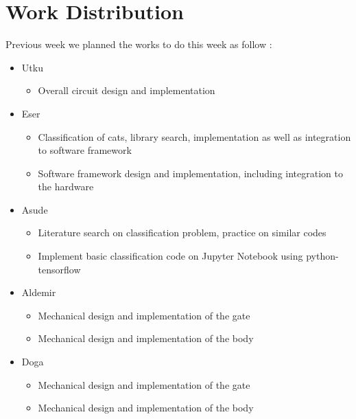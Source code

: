 \section{Work Distribution}
\label{sec:workDistribution}
Previous week we planned the works to do this week as follow :

\begin{itemize}
    \item Utku
    \begin{itemize}
        \item Overall circuit design and implementation
    \end{itemize}
    
    
    \item Eser
    \begin{itemize}
        \item Classification of cats, library search, implementation as well as integration to software framework
        \item Software framework design and implementation, including integration to the hardware
    \end{itemize}
    
    \item Asude
    \begin{itemize}
        \item Literature search on classification problem, practice on similar codes
        \item Implement basic classification code on Jupyter Notebook using python-tensorflow
    \end{itemize}
    
    \item Aldemir
    \begin{itemize}
        \item Mechanical design and implementation of the gate
        \item Mechanical design and implementation of the body
    \end{itemize}
    
    \item Doga
    \begin{itemize}
        \item Mechanical design and implementation of the gate
        \item Mechanical design and implementation of the body
    \end{itemize}
\end{itemize}